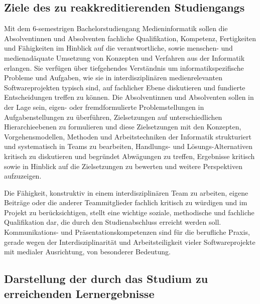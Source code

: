\subsection{Ziele des zu reakkreditierenden
Studiengangs\label{/mi-2017/selbstbericht/0200-qualifikationsziele/0000-qualifikationsziele}}\label{ziele-des-zu-reakkreditierenden-studiengangspathlabelmi-2017selbstbericht0200-qualifikationsziele0000-qualifikationsziele}

Mit dem 6-semestrigen Bachelorstudiengang Medieninformatik sollen die
Absolventinnen und Absolventen fachliche Qualifikation, Kompetenz,
Fertigkeiten und Fähigkeiten im Hinblick auf die verantwortliche, sowie
menschen- und medienadäquate Umsetzung von Konzepten und Verfahren aus
der Informatik erlangen. Sie verfügen über tiefgehendes Verständnis um
informatikspezifische Probleme und Aufgaben, wie sie in
interdisziplinären medienrelevanten Softwareprojekten typisch sind, auf
fachlicher Ebene diskutieren und fundierte Entscheidungen treffen zu
können. Die Absolventinnen und Absolventen sollen in der Lage sein,
eigen- oder fremdformulierte Problemstellungen in Aufgabenstellungen zu
überführen, Zielsetzungen auf unterschiedlichen Hierarchieebenen zu
formulieren und diese Zielsetzungen mit den Konzepten,
Vorgehensmodellen, Methoden und Arbeitstechniken der Informatik
strukturiert und systematisch in Teams zu bearbeiten, Handlungs- und
Lösungs-Alternativen kritisch zu diskutieren und begründet Abwägungen zu
treffen, Ergebnisse kritisch sowie in Hinblick auf die Zielsetzungen zu
bewerten und weitere Perspektiven aufzuzeigen.

Die Fähigkeit, konstruktiv in einem interdisziplinären Team zu arbeiten,
eigene Beiträge oder die anderer Teammitglieder fachlich kritisch zu
würdigen und im Projekt zu berücksichtigen, stellt eine wichtige
soziale, methodische und fachliche Qualifikation dar, die durch den
Studienabschluss erreicht werden soll. Kommunikations- und
Präsentationskompetenzen sind für die berufliche Praxis, gerade wegen
der Interdisziplinarität und Arbeitsteiligkeit vieler Softwareprojekte
mit medialer Ausrichtung, von besonderer Bedeutung.

\subsection{Darstellung der durch das Studium zu erreichenden
Lernergebnisse\label{/mi-2017/selbstbericht/0200-qualifikationsziele/0000-qualifikationsziele}}\label{darstellung-der-durch-das-studium-zu-erreichenden-lernergebnissepathlabelmi-2017selbstbericht0200-qualifikationsziele0000-qualifikationsziele}

